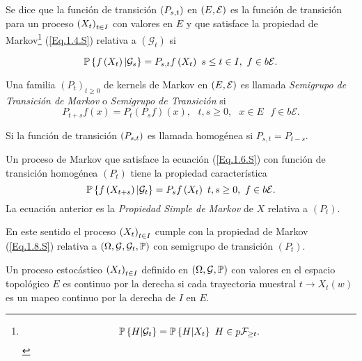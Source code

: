 Se dice que la funci\'on de transici\'on $\left(P_{s,t}\right)$ en $\left(E,\mathcal{E}\right)$ es la funci\'on de transici\'on para un proceso $\left(X_{t}\right)_{t\in I}$  con valores en $E$ y que satisface la propiedad de Markov\footnote{\begin{equation}\label{Eq.1.4.S}
\mathbb{P}\left\{H|\mathcal{G}_{t}\right\}=\mathbb{P}\left\{H|X_{t}\right\}\textrm{ }H\in p\mathcal{F}_{\geq t}.
\end{equation}} (\ref{Eq.1.4.S}) relativa a $\left(\mathcal{G}_{t}\right)$ si 

\begin{equation}\label{Eq.1.6.S}
\mathbb{P}\left\{f\left(X_{t}\right)|\mathcal{G}_{s}\right\}=P_{s,t}f\left(X_{t}\right)\textrm{ }s\leq t\in I,\textrm{ }f\in b\mathcal{E}.
\end{equation}

\begin{Def}
Una familia $\left(P_{t}\right)_{t\geq0}$ de kernels de Markov en $\left(E,\mathcal{E}\right)$ es llamada {\em Semigrupo de Transici\'on de Markov} o {\em Semigrupo de Transici\'on} si
\[P_{t+s}f\left(x\right)=P_{t}\left(P_{s}f\right)\left(x\right),\textrm{ }t,s\geq0,\textrm{ }x\in E\textrm{ }f\in b\mathcal{E}.\]
\end{Def}
\begin{Note}
Si la funci\'on de transici\'on $\left(P_{s,t}\right)$ es llamada homog\'enea si $P_{s,t}=P_{t-s}$.
\end{Note}

Un proceso de Markov que satisface la ecuaci\'on (\ref{Eq.1.6.S}) con funci\'on de transici\'on homog\'enea $\left(P_{t}\right)$ tiene la propiedad caracter\'istica
\begin{equation}\label{Eq.1.8.S}
\mathbb{P}\left\{f\left(X_{t+s}\right)|\mathcal{G}_{t}\right\}=P_{s}f\left(X_{t}\right)\textrm{ }t,s\geq0,\textrm{ }f\in b\mathcal{E}.
\end{equation}
La ecuaci\'on anterior es la {\em Propiedad Simple de Markov} de $X$ relativa a $\left(P_{t}\right)$.

En este sentido el proceso $\left(X_{t}\right)_{t\in I}$ cumple con la propiedad de Markov (\ref{Eq.1.8.S}) relativa a $\left(\Omega,\mathcal{G},\mathcal{G}_{t},\mathbb{P}\right)$ con semigrupo de transici\'on $\left(P_{t}\right)$.
\begin{Def}
Un proceso estoc\'astico $\left(X_{t}\right)_{t\in I}$ definido en $\left(\Omega,\mathcal{G},\mathbb{P}\right)$ con valores en el espacio topol\'ogico $E$ es continuo por la derecha si cada trayectoria muestral $t\rightarrow X_{t}\left(w\right)$ es un mapeo continuo por la derecha de $I$ en $E$.
\end{Def}

